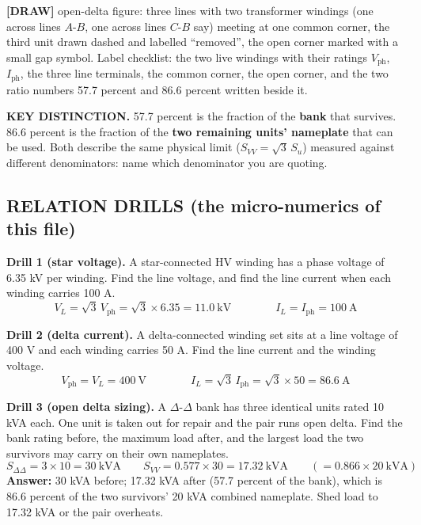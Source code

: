 \documentclass[11pt]{article}
\newcommand{\tagline}[1]{\textbf{\color{copper}#1}}
\newcommand{\keydist}[1]{\vspace{2pt}\textbf{\color{red}KEY DISTINCTION.} #1}
\newcommand{\drawline}[1]{\textbf{\color{muted}[DRAW]} #1}
\begin{document}
\drawline{open-delta figure: three lines with two transformer windings (one across lines $A$-$B$, one across lines $C$-$B$ say) meeting at one common corner, the third unit drawn dashed and labelled ``removed'', the open corner marked with a small gap symbol. Label checklist: the two live windings with their ratings $V_{\text{ph}}$, $I_{\text{ph}}$, the three line terminals, the common corner, the open corner, and the two ratio numbers 57.7 percent and 86.6 percent written beside it.}

\keydist{57.7 percent is the fraction of the \textbf{bank} that survives. 86.6 percent is the fraction of the \textbf{two remaining units' nameplate} that can be used. Both describe the same physical limit ($S_{VV} = \sqrt{3}\,S_u$) measured against different denominators: name which denominator you are quoting.}

\hrulefill
\subsection*{\color{copper}RELATION DRILLS (the micro-numerics of this file)}

\tagline{Drill 1 (star voltage).} A star-connected HV winding has a phase voltage of 6.35 kV per winding. Find the line voltage, and find the line current when each winding carries 100 A.
\[
V_L = \sqrt{3}\, V_{\text{ph}} = \sqrt{3} \times 6.35 = 11.0\ \text{kV}
\qquad\qquad
I_L = I_{\text{ph}} = 100\ \text{A}
\]

\tagline{Drill 2 (delta current).} A delta-connected winding set sits at a line voltage of 400 V and each winding carries 50 A. Find the line current and the winding voltage.
\[
V_{\text{ph}} = V_L = 400\ \text{V}
\qquad\qquad
I_L = \sqrt{3}\, I_{\text{ph}} = \sqrt{3} \times 50 = 86.6\ \text{A}
\]

\tagline{Drill 3 (open delta sizing).} A $\Delta$-$\Delta$ bank has three identical units rated 10 kVA each. One unit is taken out for repair and the pair runs open delta. Find the bank rating before, the maximum load after, and the largest load the two survivors may carry on their own nameplates.
\[
S_{\Delta\Delta} = 3 \times 10 = 30\ \text{kVA}
\qquad
S_{VV} = 0.577 \times 30 = 17.32\ \text{kVA}
\qquad
\left(= 0.866 \times 20\ \text{kVA}\right)
\]
\textbf{Answer:} 30 kVA before; 17.32 kVA after (57.7 percent of the bank), which is 86.6 percent of the two survivors' 20 kVA combined nameplate. Shed load to 17.32 kVA or the pair overheats.
\end{document}
